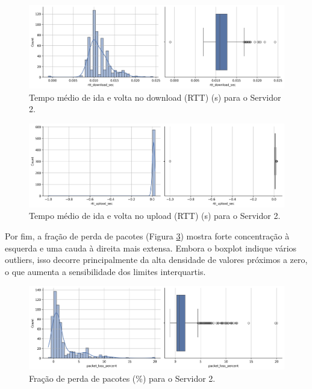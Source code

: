\documentclass{article}
\begin{document}
\begin{figure}[htp]
	\includegraphics[width=\textwidth]{../figures/eda/chart_rtt_download_sec_server02.png}
	\caption{Tempo médio de ida e volta no download (RTT) (s) para o Servidor 2.}
	\label{fig:chart_rtt_download_sec_server02}
\end{figure}

\begin{figure}[htp]
	\includegraphics[width=\textwidth]{../figures/eda/chart_rtt_upload_sec_server02.png}
	\caption{Tempo médio de ida e volta no upload (RTT) (s) para o Servidor 2.}
	\label{fig:chart_rtt_upload_sec_server02}
\end{figure}

Por fim, a fração de perda de pacotes (Figura \ref{fig:chart_packet_loss_percent_server02}) mostra forte concentração à esquerda e uma cauda à direita mais extensa.  
Embora o boxplot indique vários outliers, isso decorre principalmente da alta densidade de valores próximos a zero, o que aumenta a sensibilidade dos limites interquartis.

\begin{figure}[htp]
	\includegraphics[width=\textwidth]{../figures/eda/chart_packet_loss_percent_server02.png}
	\caption{Fração de perda de pacotes (\%) para o Servidor 2.}
	\label{fig:chart_packet_loss_percent_server02}
\end{figure}
\end{document}

